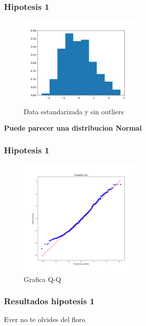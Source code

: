 \documentclass{beamer}
\begin{document}
\begin{frame}
\frametitle{Hipotesis 1}
\begin{figure}[t]
  \caption{Data estandarizada y sin outliers}
  \includegraphics[width=6cm]{data_sin_outliers.jpeg}
\end{figure}
  \textbf{Puede parecer una distribucion Normal}

\end{frame}

\begin{frame}
\frametitle{Hipotesis 1}
\begin{figure}[t]
  \caption{Grafica Q-Q}
  \includegraphics[width=6cm]{grafiaq-q.png}
\end{figure}
\end{frame}


\begin{frame}
\frametitle{Resultados hipotesis 1}
  Ever no te olvides del floro
\end{frame}
\end{document}
